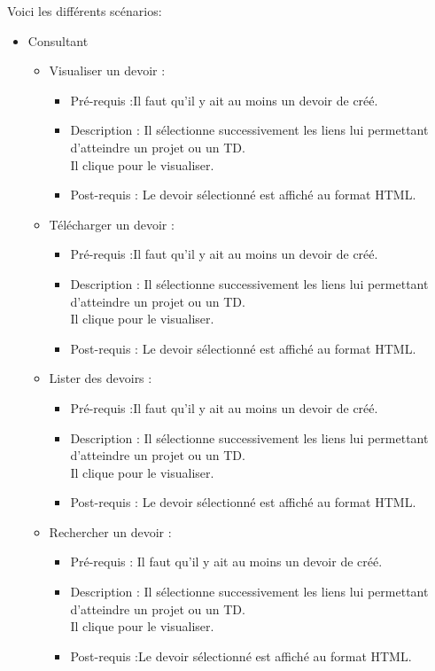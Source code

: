 Voici les diff{\'e}rents sc{\'e}narios:\\
	\begin{itemize}
	\item Consultant
		\begin{itemize}
		\item Visualiser un devoir :
			\begin{itemize}
			\item Pr{\'e}-requis :Il faut qu'il y ait au moins un devoir de cr{\'e}{\'e}.
			\item Description : Il s{\'e}lectionne successivement les liens lui permettant d'atteindre un projet ou un TD.\\
			Il clique pour le visualiser.
			\item Post-requis : Le devoir s{\'e}lectionn{\'e} est affich{\'e} au format HTML.
			\end{itemize}
			
		\item T{\'e}l{\'e}charger un devoir :
			\begin{itemize}
			\item Pr{\'e}-requis :Il faut qu'il y ait au moins un devoir de cr{\'e}{\'e}.
			\item Description : Il s{\'e}lectionne successivement les liens lui permettant d'atteindre un projet ou un TD.\\
			Il clique pour le visualiser.
			\item Post-requis : Le devoir s{\'e}lectionn{\'e} est affich{\'e} au format HTML.
			\end{itemize}

		\item Lister des devoirs :
			\begin{itemize}
			\item Pr{\'e}-requis :Il faut qu'il y ait au moins un devoir de cr{\'e}{\'e}.
			\item Description : Il s{\'e}lectionne successivement les liens lui permettant d'atteindre un projet ou un TD.\\
			Il clique pour le visualiser.
			\item Post-requis : Le devoir s{\'e}lectionn{\'e} est affich{\'e} au format HTML.
			\end{itemize}
				
		\item Rechercher un devoir :
			\begin{itemize}
			\item Pr{\'e}-requis : Il faut qu'il y ait au moins un devoir de cr{\'e}{\'e}.
			\item Description : Il s{\'e}lectionne successivement les liens lui permettant d'atteindre un projet ou un TD.\\
			Il clique pour le visualiser.
			\item Post-requis :Le devoir s{\'e}lectionn{\'e} est affich{\'e} au format HTML.
			\end{itemize}
		\end{itemize}
	\end{itemize}

